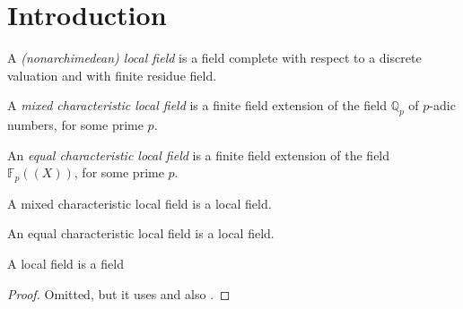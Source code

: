 \section{Introduction}

\begin{definition}
\label{local_field}
\leanok
A \textit{(nonarchimedean) local field} is a field complete with respect to a discrete
valuation and with finite residue field.
\end{definition}

\begin{definition}
\label{mixed_char_local_field}
\leanok
A \textit{mixed characteristic local field} is a finite field extension of the field 
$\mathbb{Q}_p$ of $p$-adic numbers, for some prime $p$.
\end{definition}

\begin{definition}
\label{eq_char_local_field}
\leanok
An \textit{equal characteristic local field} is a finite field extension of the field 
$\mathbb{F}_p((X))$, for some prime $p$.
\end{definition}

\begin{lemma}
\label{mixed_char_local_field.to_local_field}
A mixed characteristic local field is a local field.
\end{lemma}

\begin{lemma}
\label{eq_char_local_field.to_local_field}
An equal characteristic local field is a local field.
\end{lemma}

\begin{definition}
\label{def_local_field}
A local field is a field
\end{definition}


\begin{proof}
\leanok
Omitted, but it uses \cite{SerCF} and also \cite{Se2}.
\end{proof}